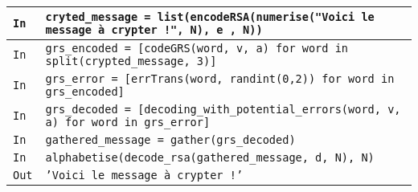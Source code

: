 \documentclass[titlepage]{article}
\begin{document}
        \begin{tabularx}{12cm}{|p{0.60cm}|X|}
            \hline
            \rowcolor{gray}
            \texttt{In}
            & 
            \texttt{cryted\_message = list(encodeRSA(numerise("Voici le message à crypter !", N), e , N))}
            \\
            \hline
            \rowcolor{gray}
            \texttt{In}
            &
            \texttt{grs\_encoded = [codeGRS(word, v, a) for word in split(crypted\_message, 3)]}
            \\
            \hline
            \rowcolor{gray}
            \texttt{In}
            &
            \texttt{grs\_error = [errTrans(word, randint(0,2)) for word in grs\_encoded]}
            \\
            \hline
            \rowcolor{gray}
            \texttt{In}
            &
            \texttt{grs\_decoded = [decoding\_with\_potential\_errors(word, v, a) for word in grs\_error]}
            \\
            \hline
            \rowcolor{gray}
            \texttt{In}
            &
            \texttt{gathered\_message = gather(grs\_decoded)}
            \\
            \hline
            \rowcolor{gray}
            \texttt{In}
            &
            \texttt{alphabetise(decode\_rsa(gathered\_message, d, N), N)}
            \\
            \hline
            \texttt{Out}
            &
            \texttt{'Voici le message à crypter !'}
            \\
            \hline
        \end{tabularx}
        \bigbreak
        
\end{document}
